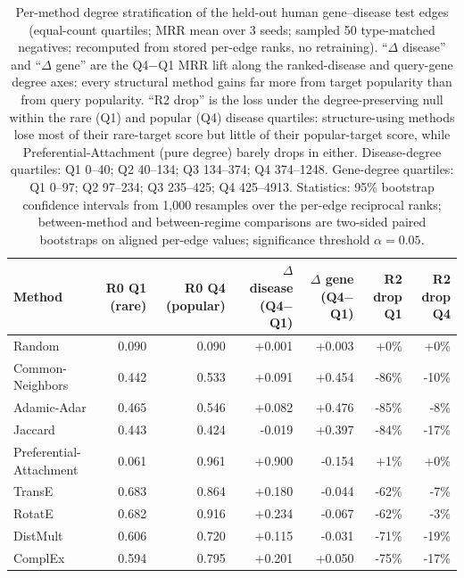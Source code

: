 \begin{table}[H]
\centering
\caption{Per-method degree stratification of the held-out human gene--disease test edges (equal-count quartiles; MRR mean over 3 seeds; sampled 50 type-matched negatives; recomputed from stored per-edge ranks, no retraining). ``$\Delta$ disease'' and ``$\Delta$ gene'' are the Q4$-$Q1 MRR lift along the ranked-disease and query-gene degree axes: every structural method gains far more from target popularity than from query popularity. ``R2 drop'' is the loss under the degree-preserving null within the rare (Q1) and popular (Q4) disease quartiles: structure-using methods lose most of their rare-target score but little of their popular-target score, while Preferential-Attachment (pure degree) barely drops in either. Disease-degree quartiles: Q1 0--40; Q2 40--134; Q3 134--374; Q4 374--1248. Gene-degree quartiles: Q1 0--97; Q2 97--234; Q3 235--425; Q4 425--4913. Statistics: 95\% bootstrap confidence intervals from 1,000 resamples over the per-edge reciprocal ranks; between-method and between-regime comparisons are two-sided paired bootstraps on aligned per-edge values; significance threshold $\alpha = 0.05$.}
\label{tab:degree_stratified}
\begin{tabular}{lrrrrrr}
\toprule
Method & R0 Q1 (rare) & R0 Q4 (popular) & $\Delta$ disease (Q4$-$Q1) & $\Delta$ gene (Q4$-$Q1) & R2 drop Q1 & R2 drop Q4 \\
\midrule
Random & 0.090 & 0.090 & +0.001 & +0.003 & +0\% & +0\% \\
Common-Neighbors & 0.442 & 0.533 & +0.091 & +0.454 & -86\% & -10\% \\
Adamic-Adar & 0.465 & 0.546 & +0.082 & +0.476 & -85\% & -8\% \\
Jaccard & 0.443 & 0.424 & -0.019 & +0.397 & -84\% & -17\% \\
Preferential-Attachment & 0.061 & 0.961 & +0.900 & -0.154 & +1\% & +0\% \\
TransE & 0.683 & 0.864 & +0.180 & -0.044 & -62\% & -7\% \\
RotatE & 0.682 & 0.916 & +0.234 & -0.067 & -62\% & -3\% \\
DistMult & 0.606 & 0.720 & +0.115 & -0.031 & -71\% & -19\% \\
ComplEx & 0.594 & 0.795 & +0.201 & +0.050 & -75\% & -17\% \\
\bottomrule
\end{tabular}
\end{table}
